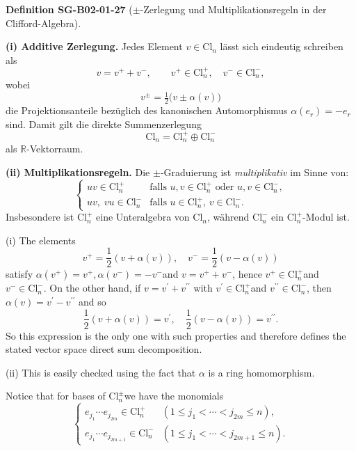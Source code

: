 \documentclass[10pt, letterpaper]{article}
\newcommand{\R}{\mathbb{R}}
\newcommand{\Cl}{\mathrm{Cl}}
\newcommand{\CustomHeading}[3]{%
  \par\medskip\noindent%
  \textbf{#1 #2} \textnormal{(#3)}.\enskip%
}
\newenvironment{DEF}[2]{\begin{unitbox}\CustomHeading{Definition}{#1}{#2}}{\end{unitbox}}
\begin{document}
\begin{DEF}{SG-B02-01-27}{$\pm$-Zerlegung und Multiplikationsregeln in der Clifford-Algebra}
\leavevmode

\textbf{(i) Additive Zerlegung.}
Jedes Element \(v\in\Cl_n\) lässt sich eindeutig schreiben als
\[
v = v^+ + v^-,
\qquad
v^+ \in \Cl_n^+, \quad v^- \in \Cl_n^-,
\]
wobei
\[
v^{\pm} = \tfrac{1}{2}\bigl(v \pm \alpha(v)\bigr)
\]
die Projektionsanteile bezüglich des kanonischen Automorphismus
\(\alpha(e_r)=-e_r\) sind.  
Damit gilt die direkte Summenzerlegung
\[
\Cl_n = \Cl_n^+ \oplus \Cl_n^-
\]
als $\R$-Vektorraum.

\medskip
\textbf{(ii) Multiplikationsregeln.}
Die $\pm$-Graduierung ist \emph{multiplikativ} im Sinne von:
\[
\begin{cases}
u v \in \Cl_n^+ & \text{falls } u,v\in\Cl_n^+ \text{ oder } u,v\in\Cl_n^-,\\[4pt]
u v,\; v u \in \Cl_n^- & \text{falls } u\in\Cl_n^+,\, v\in\Cl_n^-.
\end{cases}
\]
Insbesondere ist $\Cl_n^+$ eine Unteralgebra von $\Cl_n$, während
$\Cl_n^-$ ein $\Cl_n^+$\nobreakdash-Modul ist.


(i) The elements
$$
v^{+}=\frac{1}{2}(v+\alpha(v)), \quad v^{-}=\frac{1}{2}(v-\alpha(v))
$$
satisfy $\alpha\left(v^{+}\right)=v^{+}, \alpha\left(v^{-}\right)=-v^{-}$and $v=v^{+}+v^{-}$, hence $v^{+} \in \mathrm{Cl}_{n}^{+}$and $v^{-} \in \mathrm{Cl}_{n}^{-}$. On the other hand, if $v=v^{\prime}+v^{\prime \prime}$ with $v^{\prime} \in \mathrm{Cl}_{n}^{+}$and $v^{\prime \prime} \in \mathrm{Cl}_{n}^{-}$, then $\alpha(v)=v^{\prime}-v^{\prime \prime}$ and so
$$
\frac{1}{2}(v+\alpha(v))=v^{\prime}, \quad \frac{1}{2}(v-\alpha(v))=v^{\prime \prime} .
$$
So this expression is the only one with such properties and therefore defines the stated vector space direct sum decomposition.

(ii) This is easily checked using the fact that $\alpha$ is a ring homomorphism.
\end{DEF}



Notice that for bases of $\mathrm{Cl}_{n}^{ \pm}$we have the monomials
$$
\left\{\begin{array}{cl}
e_{j_{1}} \cdots e_{j_{2 m}} \in \mathrm{Cl}_{n}^{+} & \left(1 \leqslant j_{1}<\cdots<j_{2 m} \leqslant n\right), \\
e_{j_{1}} \cdots e_{j_{2 m+1}} \in \mathrm{Cl}_{n}^{-} & \left(1 \leqslant j_{1}<\cdots<j_{2 m+1} \leqslant n\right) .
\end{array}\right.
$$
\end{document}
